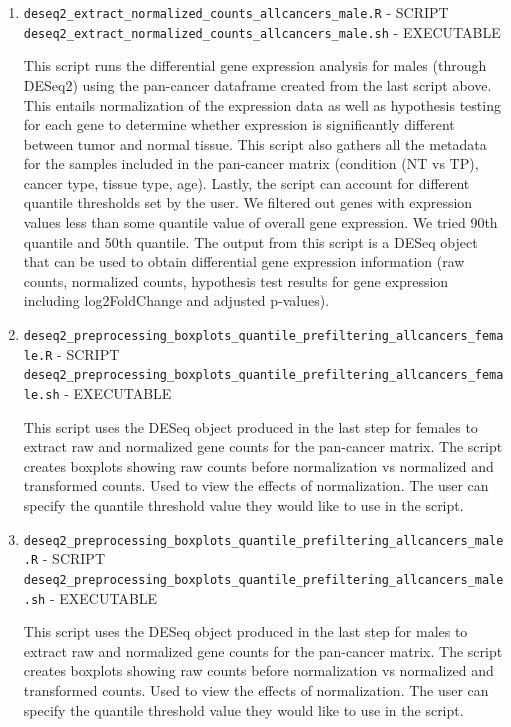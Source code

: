 \documentclass[10pt]{article}
\begin{document}
\begin{enumerate}
\item\texttt{deseq2\_extract\_normalized\_counts\_allcancers\_male.R} - SCRIPT\newline
\texttt{deseq2\_extract\_normalized\_counts\_allcancers\_male.sh} - EXECUTABLE
	
This script runs the differential gene expression analysis for males (through DESeq2) using the pan-cancer dataframe created from the last script above. This entails normalization of the expression data as well as hypothesis testing for each gene to determine whether expression is significantly different between tumor and normal tissue. This script also gathers all the metadata for the samples included in the pan-cancer matrix (condition (NT vs TP), cancer type, tissue type, age). Lastly, the script can account for different quantile thresholds set by the user. We filtered out genes with expression values less than some quantile value of overall gene expression. We tried 90th quantile and 50th quantile. The output from this script is a DESeq object that can be used to obtain differential gene expression information (raw counts, normalized counts, hypothesis test results for gene expression including log2FoldChange and adjusted p-values).
	
\item\texttt{deseq2\_preprocessing\_boxplots\_quantile\_prefiltering\_allcancers\_female.R} - SCRIPT\newline
\texttt{deseq2\_preprocessing\_boxplots\_quantile\_prefiltering\_allcancers\_female.sh} - EXECUTABLE
	
This script uses the DESeq object produced in the last step for females to extract raw and normalized gene counts for the pan-cancer matrix. The script creates boxplots showing raw counts before normalization vs normalized and transformed counts. Used to view the effects of normalization. The user can specify the quantile threshold value they would like to use in the script.
	
\item\texttt{deseq2\_preprocessing\_boxplots\_quantile\_prefiltering\_allcancers\_male.R} - SCRIPT \newline
\texttt{deseq2\_preprocessing\_boxplots\_quantile\_prefiltering\_allcancers\_male.sh} - EXECUTABLE
	
This script uses the DESeq object produced in the last step for males to extract raw and normalized gene counts for the pan-cancer matrix. The script creates boxplots showing raw counts before normalization vs normalized and transformed counts. Used to view the effects of normalization. The user can specify the quantile threshold value they would like to use in the script.


\end{enumerate}
\end{document}
